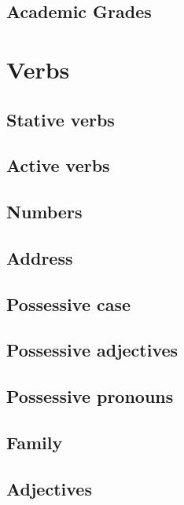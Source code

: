 \documentclass[12pt,openany]{book}
\begin{document}
	\section{Academic Grades}


\chapter{Verbs}

	\section{Stative verbs}

	\section{Active verbs}



	\section{Numbers}

	\section{Address}

	\section{Possessive case}

	\section{Possessive adjectives}

	\section{Possessive pronouns}

	\section{Family}

	\section{Adjectives}
\end{document}
